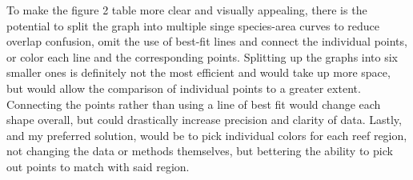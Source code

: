 \documentclass[
  letterpaper,
  DIV=11,
  numbers=noendperiod]{scrartcl}
\begin{document}
To make the figure 2 table more clear and visually appealing, there is
the potential to split the graph into multiple singe species-area curves
to reduce overlap confusion, omit the use of best-fit lines and connect
the individual points, or color each line and the corresponding points.
Splitting up the graphs into six smaller ones is definitely not the most
efficient and would take up more space, but would allow the comparison
of individual points to a greater extent. Connecting the points rather
than using a line of best fit would change each shape overall, but could
drastically increase precision and clarity of data. Lastly, and my
preferred solution, would be to pick individual colors for each reef
region, not changing the data or methods themselves, but bettering the
ability to pick out points to match with said region.
\end{document}

